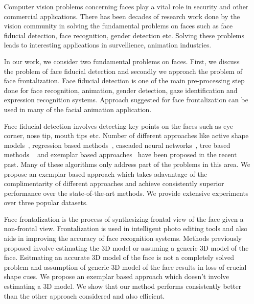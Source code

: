 Computer vision problems concerning faces play a vital role in security and other commercial applications. 
There has been decades of research work done by the vision community in solving the fundamental problems
on faces such as face fiducial detection, face recognition, gender detection etc. Solving these problems
leads to interesting applications in survellience, animation industries. 

In our work, we consider two fundamental problems on faces. First, we discuss the problem of face fiducial
detection and secondly we approach the problem of face frontalization. Face fiducial detection is one of 
the main pre-processing step done for face recognition, animation, gender detection, gaze identification
and expression recognition systems. Approach suggested for face frontalization can be used in many of the 
facial animation application.

Face fiducial detection involves detecting key points on the faces such as eye corner, nose tip, mouth tips
etc. Number of different approaches like active shape models~\cite{milborrowCVPR08_ASM}, regression based 
methods~\cite{yuECCV14_CoR}, cascaded neural networks~\cite{zhangECCV14_deepfacealign}, tree based methods
~\cite{xhuCVPR12_wild} and exemplar based approaches~\cite{kumarPAMI13_faceExem} have been proposed in the 
recent past. Many of these algorithms only address part of the problems in this area. We propose an 
exemplar based approach which takes adavantage of the complimentarity of different approaches and achieve
consistently superior performance over the state-of-the-art methods. We provide extensive experiments 
over three popular datasets.

Face frontalization is the process of synthesizing frontal view of the face given a non-frontal view. 
Frontalization is used in intelligent photo editing tools and also aids in improving the accuracy of face
 recognition systems. Methods previously proposed involve estimating the 3D model or assuming a generic
3D model of the face. Esitmating an accurate 3D model of the face is not a completely solved problem and 
assumption of generic 3D model of the face results in loss of crucial shape cues. We propose an exemplar
based approach which doesn't involve estimating a 3D model. We show that our method performs consistently
better than the other approach considered and also efficient.
